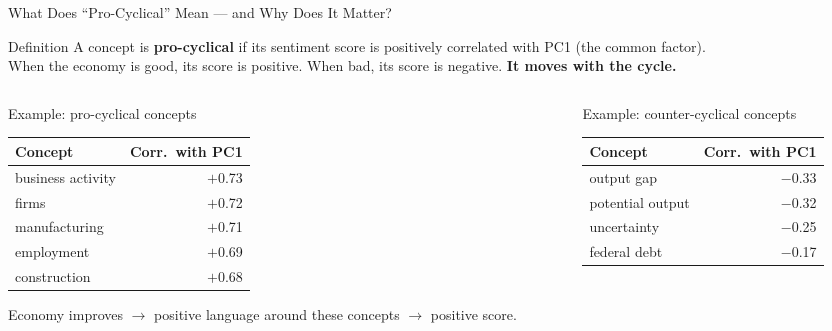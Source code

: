 \documentclass[10pt,aspectratio=169]{beamer}
\begin{document}
\begin{frame}{What Does ``Pro-Cyclical'' Mean --- and Why Does It Matter?}
  \vspace{2pt}
  \begin{block}{Definition}
    \centering\small
    A concept is \textbf{pro-cyclical} if its sentiment score is positively correlated with PC1 (the common factor).\\
    When the economy is good, its score is positive. When bad, its score is negative. \textbf{It moves with the cycle.}
  \end{block}
  \vspace{4pt}
  \begin{columns}[T]
    \begin{column}{0.48\textwidth}
      \begin{block}{Example: pro-cyclical concepts}
        \centering\footnotesize
        \begin{tabular}{lr}
          \toprule
          Concept & Corr.\ with PC1 \\
          \midrule
          business activity   & $+$0.73 \\
          firms               & $+$0.72 \\
          manufacturing       & $+$0.71 \\
          employment          & $+$0.69 \\
          construction        & $+$0.68 \\
          \bottomrule
        \end{tabular}
        \vspace{2pt}
        Economy improves $\to$ positive language around these concepts $\to$ positive score.
      \end{block}
    \end{column}
    \begin{column}{0.48\textwidth}
      \begin{block}{Example: counter-cyclical concepts}
        \centering\footnotesize
        \begin{tabular}{lr}
          \toprule
          Concept & Corr.\ with PC1 \\
          \midrule
          output gap          & $-$0.33 \\
          potential output    & $-$0.32 \\
          uncertainty         & $-$0.25 \\
          federal debt        & $-$0.17 \\

\end{tabular}
\end{block}
\end{column}
\end{columns}
\end{frame}
\end{document}
